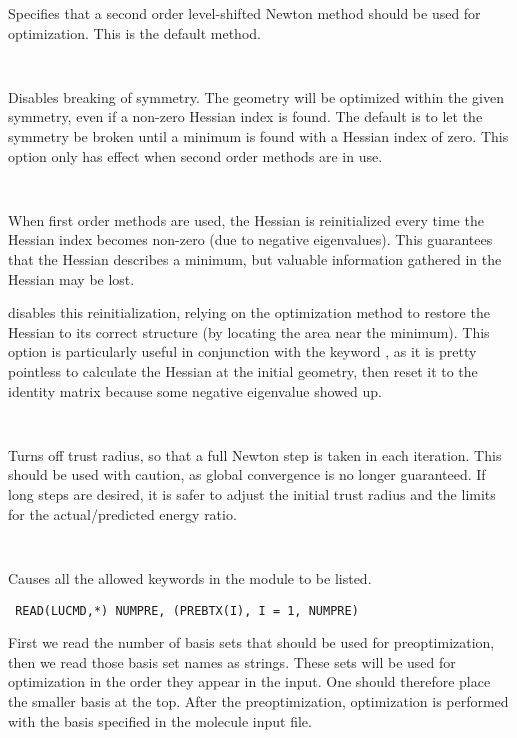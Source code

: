 \begin{description}
Specifies that a second order level-shifted Newton method should
be used for optimization. This is the default method.

\item[\Key{NOBREA}]\verb| |

Disables breaking of symmetry. The geometry will
be optimized within the given symmetry, even if a non-zero Hessian
index is found. The default is to let the symmetry be broken until
a minimum is found with a Hessian index of zero. This option only has
effect when second order methods are in use.

\item[\Key{NOREIN}]\verb| |

When first order methods are used, the Hessian is reinitialized every
time the Hessian index becomes non-zero (due to negative
eigenvalues). This guarantees that the Hessian describes a minimum,
but valuable information gathered in the Hessian may be
lost.

 disables this reinitialization, relying on the
optimization method to restore the Hessian to its correct structure
(by locating the area near the minimum). This option is particularly
useful in conjunction with the keyword , as it is pretty
pointless to calculate the Hessian at the initial geometry, then reset
it to the identity matrix because some negative eigenvalue showed up.

\item[\Key{NOTRUS}]\verb| |

Turns off trust radius, so that a full Newton step
is taken in each iteration. This should be used with caution, as
global convergence is no longer guaranteed. If long steps are desired,
it is safer to adjust the initial trust radius and the limits for the
actual/predicted energy ratio. 

\item[\Key{OPTION}]\verb| |

Causes all the allowed keywords in the 
module to be listed.

\item[\Key{PREOPT}]\verb| |
\newline
\verb|READ(LUCMD,*) NUMPRE, (PREBTX(I), I = 1, NUMPRE)|

First we read the number of basis sets that should be used for
preoptimization, then we read those basis set names as strings. These
sets will be used for optimization in the order they appear in the
input. One should therefore place the smaller basis at the top. After
the preoptimization, optimization is performed with the basis
specified in the molecule input file.


\end{description}
